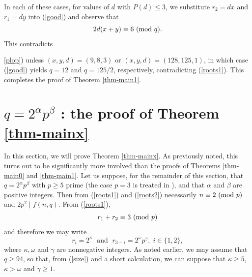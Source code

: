 \documentclass{amsart}
\def\mod#1{{\ifmmode\text{\rm\ (mod~$#1$)}
\else\discretionary{}{}{\hbox{ }}\rm(mod~$#1$)\fi}}
\begin{document}
 In each of these cases, for values of $d$ with $P(d) \leq 3$, we substitute $r_2=dx$ and $r_1=dy$ into (\ref{good}) and observe that
 $$
 2d (x+y) \equiv 6 \mod{q}.
 $$
 This contradicts {\ref{plop}) unless $(x,y,d)=(9,8,3)$ or $(x,y,d)=(128,125,1)$, in which case
 (\ref{good}) yields $q=12$ and $q=125/2$, respectively,  contradicting (\ref{roots1}). This completes the proof of Theorem \ref{thm-main1}.
 

\section{$q=2^\alpha p^\beta$ : the proof of Theorem \ref{thm-mainx}} \label{Sec3}

In this section, we will prove Theorem \ref{thm-mainx}. As previously noted, this turns out to be significantly more involved than the  proofs of Theorems  \ref{thm-main0} and   \ref{thm-main1}.
Let us suppose, for the remainder of this section, that $q=2^\alpha p^\beta$ with $p \geq 5$ prime (the case $p=3$ is treated in \cite{BZLF}),  and that $\alpha$ and $\beta$  are positive integers. Then from (\ref{roots1}) and (\ref{roots2}) necessarily $n \equiv 2 \mod{p}$ and $2p^2 \mid f(n,q)$.
 From (\ref{roots1}), 
 $$
 r_1+r_2 \equiv 3 \mod{p}
 $$
 and therefore we may write
 \begin{equation} \label{general}
r_i=2^\kappa \; \mbox{ and } \; r_{3-i} = 2^\omega p^\gamma, \; i \in \{ 1, 2 \},
\end{equation}
 where $\kappa, \omega$ and $\gamma$  are nonnegative integers. As noted earlier, we may assume that $q \geq 94$, so that, from (\ref{size}) and a short calculation, we can suppose that $\kappa \geq 5$, $\kappa > \omega$ and $\gamma \geq 1$.
 
}
\end{document}
